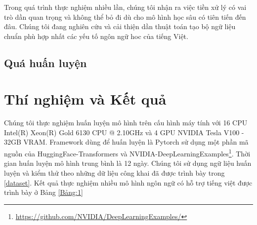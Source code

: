 \documentclass[10pt, conference, a4paper, compsocconf]{IEEEtran}
\begin{document}
Trong quá trình thực nghiệm nhiều lần, chúng tôi nhận ra việc tiền xử lý có vai trò dần quan trọng và không thể bỏ đi dù cho mô hình học sâu có tiên tiến đến đâu.
Chúng tôi đang nghiên cứu và cải thiện dần thuật toán tạo bộ ngữ liệu chuẩn phù hợp nhất các yếu tố ngôn ngữ hoc của tiếng Việt.



\subsection{Quá huấn luyện}

\section{Thí nghiệm và Kết quả}
Chúng tôi thực nghiệm huấn luyện mô hình trên cấu hình máy tính với 
16 CPU Intel(R) Xeon(R) Gold 6130 CPU @ 2.10GHz và 4 GPU NVIDIA Tesla V100 - 32GB VRAM. 
Framework dùng để huấn luyện là Pytorch sử dụng một phần mã nguồn của HuggingFace-Transformers\cite{Taylor1953} 
và NVIDIA-DeepLearningExamples\footnote{\url{https://github.com/NVIDIA/DeepLearningExamples/}}.
Thời gian huấn luyện mô hình trung bình là 12 ngày. 
Chúng tôi sử dụng ngữ liệu huấn luyện và kiểm thử theo những dữ liệu công khai đã được trình bày trong \ref{dataset}.
Kết quả thực nghiệm nhiều mô hình ngôn ngữ có hỗ trợ tiếng việt được trình bày ở Bảng \ref{Bảng:1}
\end{document}
